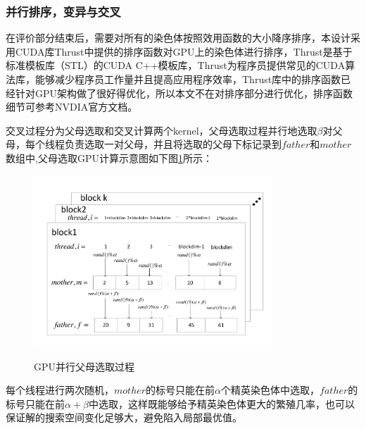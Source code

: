 \subsubsection{并行排序，变异与交叉}
在评价部分结束后，需要对所有的染色体按照效用函数的大小降序排序，本设计采用CUDA库Thrust中提供的排序函数对GPU上的染色体进行排序，Thrust是基于标准模板库（STL）的CUDA C++模板库，Thrust为程序员提供常见的CUDA算法库，能够减少程序员工作量并且提高应用程序效率，Thrust库中的排序函数已经针对GPU架构做了很好得优化，所以本文不在对排序部分进行优化，排序函数细节可参考NVDIA官方文档。

交叉过程分为父母选取和交叉计算两个kernel，父母选取过程并行地选取$\beta$对父母，每个线程负责选取一对父母，并且将选取的父母下标记录到$father$和$mother$数组中,父母选取GPU计算示意图如下图\ref{pp}所示：
\begin{figure}
\setlength{\abovecaptionskip}{-0.5cm}
\begin{center}
{\includegraphics[width=0.8\textwidth]{figures/GPUchoose.pdf}}
\end{center}
\caption{{\footnotesize{GPU并行父母选取过程}}}
\label{pp}
\end{figure}
每个线程进行两次随机，$mother$的标号只能在前$\alpha$个精英染色体中选取，$father$的标号只能在前$\alpha+\beta$中选取，这样既能够给予精英染色体更大的繁殖几率，也可以保证解的搜索空间变化足够大，避免陷入局部最优值。

